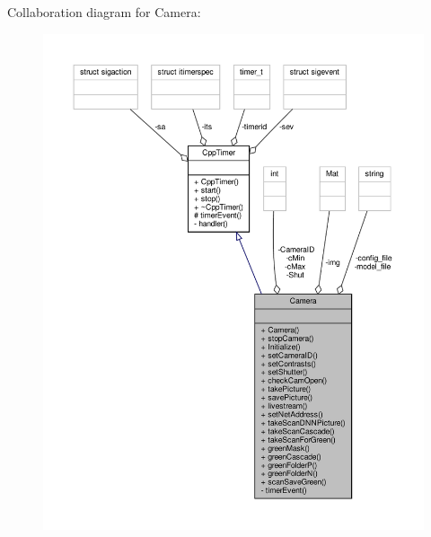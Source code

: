 Collaboration diagram for Camera\+:\nopagebreak
\begin{figure}[H]
\begin{center}
\leavevmode
\includegraphics[width=350pt]{classCamera__coll__graph}
\end{center}
\end{figure}
